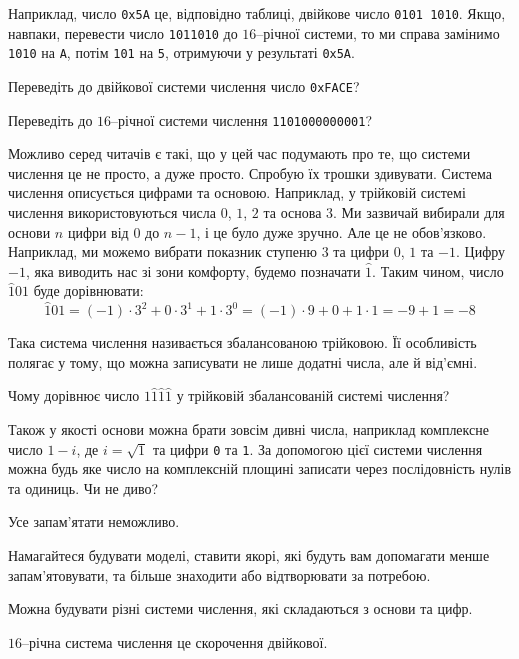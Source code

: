 \documentclass{book}
\newcommand{\bitstr}[1]{{\tt #1}}
\newcommand{\hexstr}[1]{{\tt 0x#1}}
\begin{document}
Наприклад, число \hexstr{5A} це, відповідно таблиці, двійкове число \bitstr{0101~1010}.
Якщо, навпаки,  перевести число \bitstr{1011010} до $16$--річної системи, то ми справа замінимо \bitstr{1010} на \bitstr{A}, потім \bitstr{101} на \bitstr{5}, отримуючи у результаті \hexstr{5A}.

\begin{exercise}
Переведіть до двійкової системи числення число \hexstr{FACE}?
\end{exercise}

\begin{exercise}
Переведіть до $16$--річної системи числення \bitstr{1101000000001}?
\end{exercise}

Можливо серед читачів є такі, що у цей час подумають про те, що системи числення це не просто, а дуже просто.
Спробую їх трошки здивувати.
Система числення описується цифрами та основою.
Наприклад, у трійковій системі числення використовуються числа $0$, $1$, $2$ та основа $3$.
Ми зазвичай вибирали для основи $n$ цифри від $0$ до $n-1$, і це було дуже зручно.
Але це не обов'язково.
Наприклад, ми можемо вибрати показник ступеню $3$ та цифри $0$, $1$ та $-1$.
Цифру $-1$, яка виводить нас зі зони комфорту, будемо позначати $\hat 1$.
Таким чином, число $\hat 101$ буде дорівнювати:
$$
  \hat 101 = (-1) \cdot 3^2 + 0 \cdot 3^1 + 1 \cdot 3^0 = (-1) \cdot 9 + 0 + 1 \cdot 1 = -9 + 1 = -8
$$

Така система числення називається збалансованою трійковою.
Її особливість полягає у тому, що можна записувати не лише додатні числа, але й від'ємні.

\begin{exercise}
Чому дорівнює число $1\hat1\hat1\hat1$ у трійковій збалансованій системі числення?
\end{exercise}

Також у якості основи можна брати зовсім дивні числа, наприклад комплексне число $1-i$, де $i=\sqrt{1}$ та цифри \bitstr{0} та \bitstr{1}.
За допомогою цієї системи числення можна будь яке число на комплексній площині записати через послідовність нулів та одиниць.
Чи не диво?

\begin{summary}
\item Усе запам'ятати неможливо.
\item Намагайтеся будувати моделі, ставити якорі, які будуть вам допомагати менше запам'ятовувати, та більше знаходити або відтворювати за потребою.
\item Можна будувати різні системи числення, які складаються з основи та цифр.
\item $16$--річна система числення це скорочення двійкової.
\end{summary}
\end{document}
